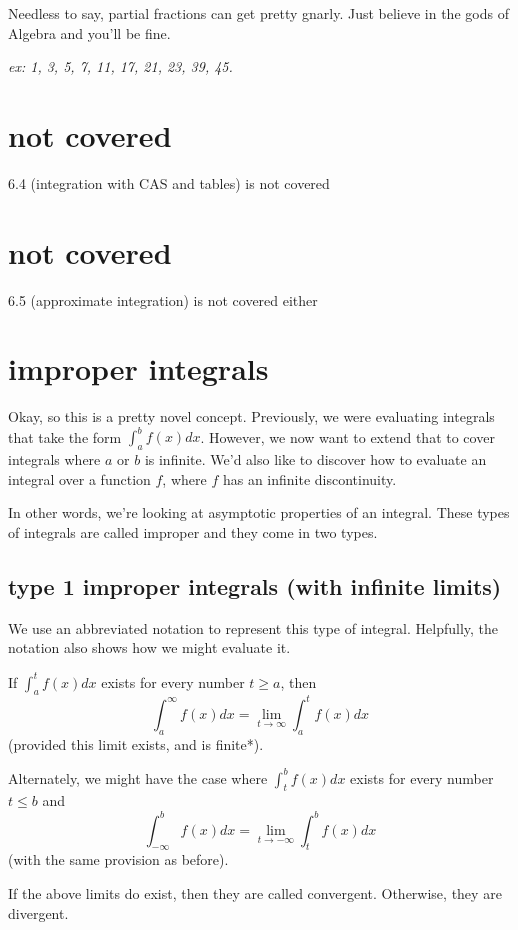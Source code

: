 \documentclass[10pt,a4paper]{report}
\begin{document}
Needless to say, partial fractions can get pretty gnarly. Just believe in the gods of Algebra and you'll be fine.

\emph{ex: 1, 3, 5, 7, 11, 17, 21, 23, 39, 45.}


\section{not covered}

6.4 (integration with CAS and tables) is not covered

\section{not covered}

6.5 (approximate integration) is not covered either

\section{improper integrals}

Okay, so this is a pretty novel concept. Previously, we were evaluating integrals that take the form $\int_a^b f(x)dx$. However, we now want to extend that to cover integrals where $a$ or $b$ is infinite. We'd also like to discover how to evaluate an integral over a function $f$, where $f$ has an infinite discontinuity.

In other words, we're looking at asymptotic properties of an integral. These types of integrals are called improper and they come in two types.

\subsection{type 1 improper integrals (with infinite limits)}

We use an abbreviated notation to represent this type of integral. Helpfully, the notation also shows how we might evaluate it.

If $\int_a^t f(x)dx$ exists for every number $t \geq a$, then
$$
	\int_a^{\infty} f(x) dx = \lim_{t \to \infty} \int_a^t f(x) dx
$$
(provided this limit exists, and is finite*).

Alternately, we might have the case where $\int_t^b f(x) dx$ exists for every number $t \leq b$ and
$$
	\int_{-\infty}^b f(x)dx = \lim_{t \to -\infty} \int_t^b f(x)dx
$$
(with the same provision as before).

If the above limits do exist, then they are called convergent. Otherwise, they are divergent.
\end{document}
